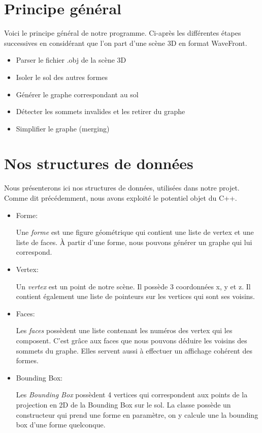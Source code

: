 \documentclass[a4paper,12pt]{report}
\begin{document}
\section{Principe général}

Voici le principe général de notre programme. Ci-après les différentes étapes successives en considérant que l'on part d'une scène 3D en format WaveFront.

\begin{itemize}
 \item Parser le fichier .obj de la scène 3D
 \item Isoler le sol des autres formes
 \item Générer le graphe correspondant au sol
 \item Détecter les sommets invalides et les retirer du graphe
 \item Simplifier le graphe (merging)
\end{itemize}

\section{Nos structures de données}

Nous présenterons ici nos structures de données, utilisées dans notre projet. Comme dit précédemment, nous avons exploité le potentiel objet du C++.

\begin{itemize}
 \item Forme:

Une \textit{forme} est une figure géométrique qui contient une liste de vertex et une liste de faces. À partir d'une forme, nous pouvons générer un graphe qui lui correspond.
 
 \item Vertex:

Un \textit{vertex} est un point de notre scène. Il possède 3 coordonnées x, y et z. Il contient également une liste de pointeurs sur les vertices qui sont ses voisins.

 \item Faces:

Les \textit{faces} possèdent une liste contenant les numéros des vertex qui les composent. C'est grâce aux faces que nous pouvons déduire les voisins des sommets du graphe. Elles servent aussi à effectuer un affichage cohérent des formes.

 \item Bounding Box:

Les \textit{Bounding Box} possèdent 4 vertices qui correspondent aux points de la projection en 2D de la Bounding Box sur le sol. La classe possède un constructeur qui prend une forme en paramètre, on y calcule une la bounding box d'une forme quelconque.

\end{itemize}
\end{document}
